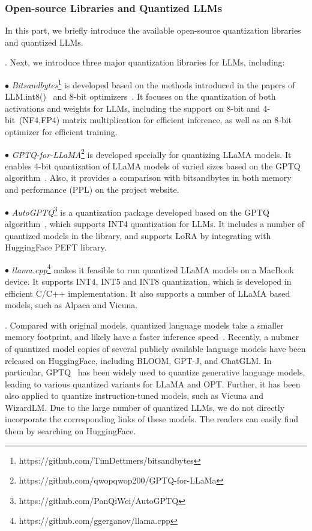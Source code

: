 \subsubsection{Open-source  Libraries and Quantized LLMs} 
In this part, we briefly introduce the available open-source  quantization libraries and quantized LLMs. 

. Next, we introduce three major quantization libraries for LLMs, including:  

$\bullet$ \emph{Bitsandbytes}\footnote{https://github.com/TimDettmers/bitsandbytes} is developed based on the methods introduced in the papers of LLM.int8()~\cite{Dettmers-arxiv-2022-LLM} and 8-bit optimizers~\cite{Dettmers-ICLR-2022-8bit}. 
{It focuses on the quantization of both activations and weights for LLMs, including the support on 8-bit and 4-bit~(NF4,FP4) matrix multiplication for efficient inference, as well as an 8-bit optimizer for efficient training.}

$\bullet$ \emph{GPTQ-for-LLaMA}\footnote{https://github.com/qwopqwop200/GPTQ-for-LLaMa} is  developed specially for quantizing LLaMA models. It enables 4-bit quantization of LLaMA models of varied sizes based on the GPTQ algorithm~\cite{frantar-arxiv-2022-gptq}. Also, it provides a comparison with bitsandbytes in both memory and performance (PPL) on the project website. 


$\bullet$ \emph{AutoGPTQ}\footnote{https://github.com/PanQiWei/AutoGPTQ} is a quantization package developed based on the GPTQ algorithm~\cite{frantar-arxiv-2022-gptq}, which supports INT4 quantization for LLMs. 
It includes a number of quantized models in the library, and supports  LoRA by integrating with HuggingFace PEFT library. 


$\bullet$ \emph{llama.cpp}\footnote{https://github.com/ggerganov/llama.cpp} makes it feasible to run  quantized LLaMA models on a MacBook device.
It supports INT4, INT5 and INT8 quantization, which is developed in efficient C/C++ implementation. It also supports a number of LLaMA based models, such as Alpaca and  Vicuna. 









. 
Compared with original models, quantized language models take a smaller memory footprint, and likely have a faster inference speed~\cite{Dettmers-arxiv-2022-LLM,Tao-ACL-2022-Compression,Zeng-arxiv-2022-GLM}.  
Recently, a nubmer of quantized model copies of several publicly available language models have been released on HuggingFace, including BLOOM, GPT-J, and ChatGLM. 
In particular, GPTQ~\cite{frantar-arxiv-2022-gptq} has been widely used to quantize generative language models, leading to various quantized variants for LLaMA and OPT. Further, it has been also applied to  quantize instruction-tuned models, such as Vicuna and WizardLM. Due to the large number of quantized LLMs, we do not directly incorporate the corresponding links of these models. The readers can easily find them by searching on HuggingFace. 

%


